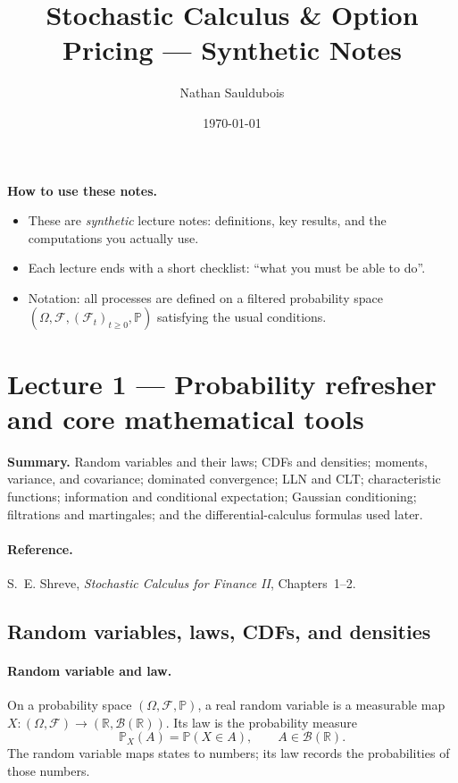 \documentclass[11pt]{article}
\title{Stochastic Calculus \& Option Pricing --- Synthetic Notes}
\author{Nathan Sauldubois}
\date{\today}
\newcommand{\R}{\mathbb{R}}
\newcommand{\F}{\mathcal{F}}
\newcommand{\Pbb}{\mathbb{P}}
\newcommand{\1}{\mathbf{1}}
\theoremstyle{plain}
\theoremstyle{definition}
\theoremstyle{remark}
\newcommand{\lecturesummary}[1]{%
\begin{center}
\begin{minipage}{0.95\linewidth}
\small\textbf{Summary.} #1
\end{minipage}
\end{center}
\vspace{0.5em}
}
\begin{document}
\maketitle
\vspace{-0.8em}

\noindent\textbf{How to use these notes.}
\begin{itemize}[leftmargin=1.4em, itemsep=0.2em]
  \item These are \emph{synthetic} lecture notes: definitions, key results, and the computations you actually use.
  \item Each lecture ends with a short checklist: ``what you must be able to do''.
  \item Notation: all processes are defined on a filtered probability space $(\Omega,\F,(\F_t)_{t\ge 0},\Pbb)$ satisfying the usual conditions.
\end{itemize}

\tableofcontents
\bigskip


\section{Lecture 1 --- Probability refresher and core mathematical tools}

\lecturesummary{Random variables and their laws; CDFs and densities; moments,
variance, and covariance; dominated convergence; LLN and CLT; characteristic
functions; information and conditional expectation; Gaussian conditioning;
filtrations and martingales; and the differential-calculus formulas used later.}

\paragraph{Reference.}
S.~E. Shreve, \textit{Stochastic Calculus for Finance II}, Chapters~1--2.

\subsection{Random variables, laws, CDFs, and densities}

\paragraph{Random variable and law.}
On a probability space $(\Omega,\F,\Pbb)$, a real random variable is a
measurable map $X:(\Omega,\F)\to(\R,\mathcal B(\R))$. Its law is the
probability measure
\[
\Pbb_X(A)=\Pbb(X\in A),
\qquad A\in\mathcal B(\R).
\]
The random variable maps states to numbers; its law records the probabilities
of those numbers.
\end{document}

